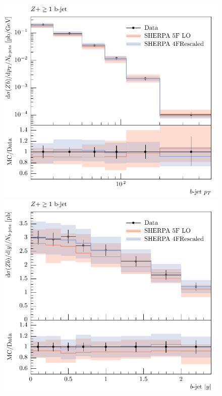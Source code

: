 \documentclass[11pt]{cernrep}
\begin{document}
\begin{figure}[htbp]
\begin{center}
   \includegraphics[scale=0.65]{figs/zbb/sherpa/d03-x01-y01_rescaled.pdf} 
   \includegraphics[scale=0.65]{figs/zbb/sherpa/d05-x01-y01_rescaled.pdf} \\

\end{center}
\end{figure}
\end{document}
